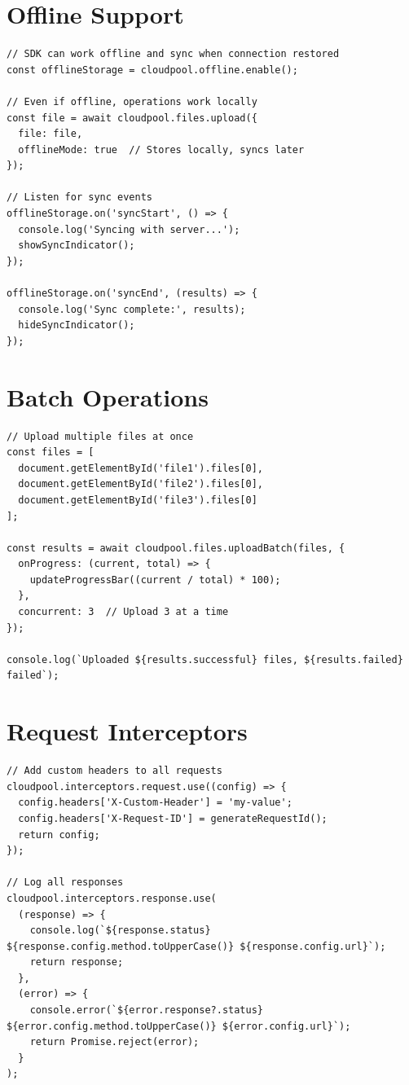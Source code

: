 \documentclass[11pt,a4paper]{report}
\begin{document}
\section{Offline Support}


\begin{lstlisting}[language=text]
// SDK can work offline and sync when connection restored
const offlineStorage = cloudpool.offline.enable();

// Even if offline, operations work locally
const file = await cloudpool.files.upload({
  file: file,
  offlineMode: true  // Stores locally, syncs later
});

// Listen for sync events
offlineStorage.on('syncStart', () => {
  console.log('Syncing with server...');
  showSyncIndicator();
});

offlineStorage.on('syncEnd', (results) => {
  console.log('Sync complete:', results);
  hideSyncIndicator();
});
\end{lstlisting}


\section{Batch Operations}


\begin{lstlisting}[language=text]
// Upload multiple files at once
const files = [
  document.getElementById('file1').files[0],
  document.getElementById('file2').files[0],
  document.getElementById('file3').files[0]
];

const results = await cloudpool.files.uploadBatch(files, {
  onProgress: (current, total) => {
    updateProgressBar((current / total) * 100);
  },
  concurrent: 3  // Upload 3 at a time
});

console.log(`Uploaded ${results.successful} files, ${results.failed} failed`);
\end{lstlisting}


\section{Request Interceptors}


\begin{lstlisting}[language=text]
// Add custom headers to all requests
cloudpool.interceptors.request.use((config) => {
  config.headers['X-Custom-Header'] = 'my-value';
  config.headers['X-Request-ID'] = generateRequestId();
  return config;
});

// Log all responses
cloudpool.interceptors.response.use(
  (response) => {
    console.log(`${response.status} ${response.config.method.toUpperCase()} ${response.config.url}`);
    return response;
  },
  (error) => {
    console.error(`${error.response?.status} ${error.config.method.toUpperCase()} ${error.config.url}`);
    return Promise.reject(error);
  }
);
\end{lstlisting}
\end{document}
